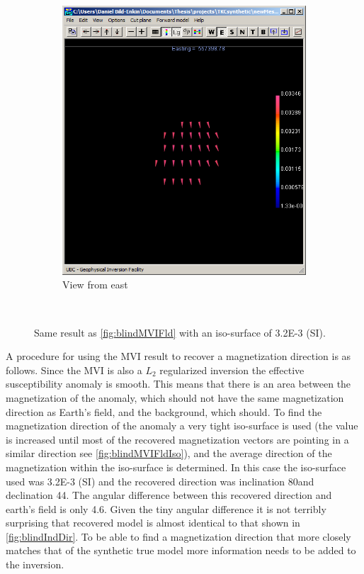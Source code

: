 \begin{figure}
\begin{subfigure}[b]{0.3\textwidth}
        \includegraphics[width=\textwidth]{images/TKC/blindMVIeastFldIso.PNG}
        \caption{View from east}
        \label{fig:blindMVIeastFldIso}
    \end{subfigure}
    ~ %
   \caption{Same result as \autoref{fig:blindMVIFld} with an iso-surface of 3.2E-3 (SI).}
   \label{fig:blindMVIFldIso}
\end{figure}


A procedure for using the \ac{MVI} result to recover a magnetization direction is as follows. Since the \ac{MVI} is also a $L_2$ regularized inversion the effective susceptibility anomaly is smooth. This means that there is an area between the magnetization of the anomaly, which should not have the same magnetization direction as Earth's field, and the background, which should. To find the magnetization direction of the anomaly a very tight iso-surface is used (the value is increased until most of the recovered magnetization vectors are pointing in a similar direction see \autoref{fig:blindMVIFldIso}), and the average direction of the magnetization within the iso-surface is determined. In this case the iso-surface used was 3.2E-3 (SI) and the recovered direction was inclination 80\degree and declination 44\degree. The angular difference between this recovered direction and earth's field is only 4.6\degree. Given the tiny angular difference it is not terribly surprising that recovered model is almost identical to that shown in \autoref{fig:blindIndDir}. To be able to find a magnetization direction that more closely matches that of the synthetic true model more information needs to be added to the inversion.

